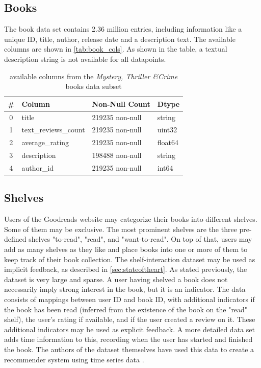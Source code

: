 \documentclass[10pt,final,journal,a4paper,oneside,twocolumn]{IEEEtran}
\begin{document}
\subsection{Books}
The book data set contains 2.36 million entries, including information like a unique ID, title, author, release date and a description text. The available columns are shown in \autoref{tab:book_cols}. As shown in the table, a textual description string is not available for all datapoints.
\begin{table}[h]        
    \centering
    \caption{available columns from the \emph{Mystery, Thriller \&Crime} books data subset}
    \begin{tabular}{clll}
            \toprule
            \# & Column & Non-Null Count & Dtype \\
            \midrule
            0 & title & 219235 non-null & string \\
            1 & text\_reviews\_count & 219235 non-null & uint32 \\
            2 & average\_rating & 219235 non-null & float64 \\
            3 & description & 198488 non-null & string \\
            4 & author\_id & 219235 non-null & int64 \\
            \bottomrule
        \end{tabular}
\label{tab:book_cols}
\end{table}
    

\subsection{Shelves}
Users of the Goodreads website may categorize their books into different shelves. Some of them may be exclusive. The most prominent shelves are the three pre-defined shelves "to-read", "read", and "want-to-read". On top of that, users may add as many shelves as they like and place books into one or more of them to keep track of their book collection.
The shelf-interaction dataset may be used as implicit feedback, as described in \autoref{sec:stateoftheart}. As stated previously, the dataset is very large and sparse. A user having shelved a book does not necessarily imply strong interest in the book, but it is an indicator. 
The data consists of mappings between user ID and book ID, with additional indicators if the book has been read (inferred from the existence of the book on the "read" shelf), the user's rating if available, and if the user created a review on it. These additional indicators may be used as explicit feedback.
A more detailed data set adds time information to this, recording when the user has started and finished the book. The authors of the dataset themselves have used this data to create a recommender system using time series data \cite{Pera.2018}.
\end{document}
